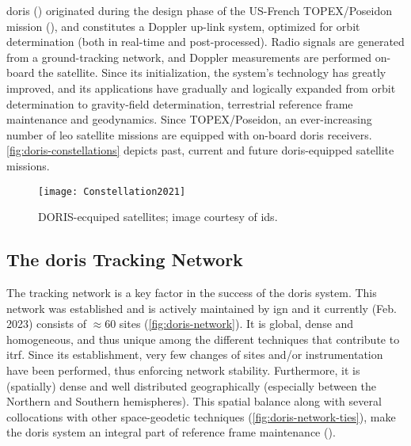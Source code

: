 \gls{doris} (\cite{Barlier2005}) originated during the design phase of the US-French 
TOPEX/Poseidon mission (\cite{Fu1994}), 
and constitutes a Doppler up-link system, optimized for orbit determination (both 
in real-time and post-processed). Radio signals are generated from a ground-tracking 
network, and Doppler measurements are performed on-board the satellite. Since its 
initialization, the system's technology has greatly improved, and its applications 
have gradually and logically expanded from orbit determination to gravity-field 
determination, terrestrial reference frame maintenance and geodynamics. Since TOPEX/Poseidon, an 
ever-increasing number of \gls{leo} satellite missions are equipped with on-board 
\gls{doris} receivers. \autoref{fig:doris-constellations} depicts past, current and 
future \gls{doris}-equipped satellite missions.

\begin{figure}[h!]
  \centering
  \texttt{[image: Constellation2021]}
  \caption{DORIS-ecquiped satellites; image courtesy of \gls{ids}.}
  \label{fig:doris-constellations}
\end{figure}

\iffalse
\begin{description}
  \item[Atmospheric Studies] including troposphere () and ionosphere ()
  \item[Reference Frames] \cite{Willis2007}
  \item[Space Weather and Solar Activity] \cite{Willis2005}
  \item[Tectonics] \cite{}
\end{description}
\fi

\subsection{The \gls{doris} Tracking Network}\label{ssec:doris-tracking-network}
The tracking network is a key factor in the success of the \gls{doris} system. 
This network was established and is actively maintained by \gls{ign} and it currently 
(Feb. 2023) consists of $\approx 60$ sites (\autoref{fig:doris-network}). It is global, dense 
and homogeneous, and thus unique among the different techniques that contribute to 
\gls{itrf}. Since its establishment, very few changes of sites and/or instrumentation 
have been performed, thus enforcing network stability. Furthermore, it is (spatially) 
dense and well distributed geographically (especially between the Northern and  
Southern hemispheres). This spatial balance along with several collocations with 
other space-geodetic techniques (\autoref{fig:doris-network-ties}), make the 
\gls{doris} system an integral part of reference frame maintenance (\cite{Moreaux2022}).

